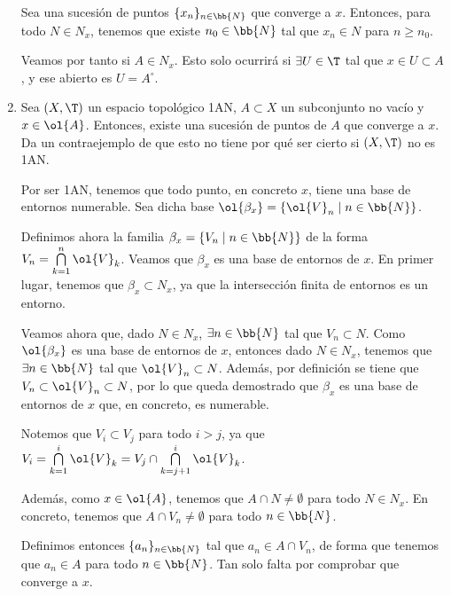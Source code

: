 \begin{ejercicio}
\begin{enumerate}[label=\alph*)]
        Sea una sucesión de puntos $\{x_n\}_{n\in \bb{N}}$ que converge a $x$. Entonces, para todo $N\in N_x$, tenemos que existe $n_0\in \bb{N}$ tal que $x_n\in N$ para $n\geq n_0$.

        Veamos por tanto si $A\in N_x$. Esto solo ocurrirá si $\exists U\in \T$ tal que $x\in U\subset A$, y ese abierto es $U=A^\circ$.

        \item Sea $(X,\T)$ un espacio topológico 1AN, $A\subset X$ un subconjunto no vacío y $x\in \ol{A}$. Entonces, existe una sucesión de puntos de $A$ que converge a $x$. Da un contraejemplo de que esto no tiene por qué ser cierto si $(X,\T)$ no es 1AN.

        Por ser 1AN, tenemos que todo punto, en concreto $x$, tiene una base de entornos numerable. Sea dicha base $\ol{\beta_x}=\{\ol{V}_n\mid n\in \bb{N}\}$.

        Definimos ahora la familia $\beta_x=\{V_n \mid n\in \bb{N}\}$ de la forma $V_n=\bigcap\limits_{k=1}^n \ol{V}_k$. Veamos que $\beta_x$ es una base de entornos de $x$. En primer lugar, tenemos que $\beta_x\subset N_x$, ya que la intersección finita de entornos es un entorno.
        
        Veamos ahora que, dado $N\in N_x$, $\exists n\in \bb{N}$ tal que $V_n\subset N$. Como $\ol{\beta_x}$ es una base de entornos de $x$, entonces dado $N\in N_x$, tenemos que $\exists n\in \bb{N}$ tal que $\ol{V}_n\subset N$. Además, por definición se tiene que $V_n\subset \ol{V}_n \subset N$, por lo que queda demostrado que $\beta_x$ es una base de entornos de $x$ que, en concreto, es numerable.

        Notemos que $V_i\subset V_j$ para todo $i>j$, ya que $V_i=\bigcap\limits_{k=1}^i \ol{V}_k=V_j\cap \bigcap\limits_{k=j+1}^i \ol{V}_k$.        

        Además, como $x\in \ol{A}$, tenemos que $A\cap N\neq \emptyset$ para todo $N\in N_x$. En concreto, tenemos que $A\cap V_n\neq \emptyset$ para todo $n\in \bb{N}$.

        Definimos entonces $\{a_n\}_{n\in \bb{N}}$ tal que $a_n\in A\cap V_n$, de forma que tenemos que $a_n\in A$ para todo $n\in \bb{N}$. Tan solo falta por comprobar que converge a $x$.


\end{enumerate}
\end{ejercicio}
